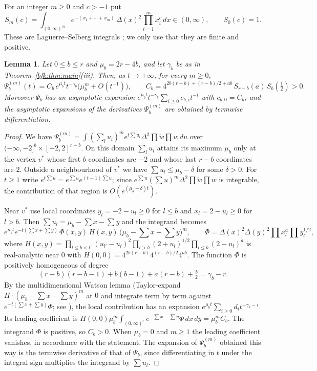 \documentclass[11pt,a4paper]{article}
\newtheorem{lemma}[theorem]{Lemma}
\theoremstyle{definition}
\theoremstyle{remark}
\numberwithin{equation}{section}
\begin{document}
For an integer $m\ge0$ and $c>-1$ put
\[
S_m(c)=\int_{(0,\infty)^m}e^{-(x_1+\cdots+x_m)}\,\Delta(x)^2\prod_{i=1}^mx_i^{c}\,dx\in(0,\infty),\qquad S_0(c)=1 .
\]
These are Laguerre--Selberg integrals \cite{FW08}; we only use that they are finite and positive.

\begin{lemma}\label{bfk:lem:vertex}
Let $0\le b\le r$ and $\mu_b=2r-4b$, and let $\gamma_b$ be as in Theorem~\ref{bfk:thm:main}(iii). Then, as $t\to+\infty$, for every $m\ge0$,
\[
\Psi_b^{(m)}(t)=C_b\,e^{\mu_bt}t^{-\gamma_b}\bigl(\mu_b^m+O(t^{-1})\bigr),\qquad
C_b=4^{2b(r-b)+(r-b)/2+ab}\,S_{r-b}(a)\,S_b(\tfrac12)>0 .
\]
Moreover $\Psi_b$ has an asymptotic expansion $e^{\mu_bt}t^{-\gamma_b}\sum_{i\ge0}c_{b,i}t^{-i}$ with $c_{b,0}=C_b$, and the asymptotic expansions of the derivatives $\Psi_b^{(m)}$ are obtained by termwise differentiation.
\end{lemma}

\begin{proof}
We have $\Psi_b^{(m)}=\int(\textstyle\sum_lu_l)^me^{t\sum u_l}\Delta^2\prod\tilde w\prod w\,du$ over $(-\infty,-2]^b\times[-2,2]^{r-b}$. On this domain $\sum_lu_l$ attains its maximum $\mu_b$ only at the vertex $v^*$ whose first $b$ coordinates are $-2$ and whose last $r-b$ coordinates are $2$. Outside a neighbourhood of $v^*$ we have $\sum u_l\le\mu_b-\delta$ for some $\delta>0$. For $t\ge1$ write $e^{t\sum u}=e^{\sum u}e^{(t-1)\sum u}$; since $e^{\sum u}(\sum u)^m\Delta^2\prod\tilde w\prod w$ is integrable, the contribution of that region is $O(e^{(\mu_b-\delta)t})$.

Near $v^*$ use local coordinates $y_l=-2-u_l\ge0$ for $l\le b$ and $x_l=2-u_l\ge0$ for $l>b$. Then $\sum u_l=\mu_b-\sum x-\sum y$ and the integrand becomes
\[
e^{\mu_bt}e^{-t(\sum x+\sum y)}\,\Phi(x,y)\,H(x,y)\,\bigl(\mu_b-\textstyle\sum x-\sum y\bigr)^m,
\qquad \Phi=\Delta(x)^2\Delta(y)^2\prod x_l^{a}\prod y_l^{1/2},
\]
where $H(x,y)=\prod_{l\le b<l'}(u_{l'}-u_l)^2\prod_{l>b}(2+u_l)^{1/2}\prod_{l\le b}(2-u_l)^{a}$ is real-analytic near $0$ with $H(0,0)=4^{2b(r-b)}4^{(r-b)/2}4^{ab}$. The function $\Phi$ is positively homogeneous of degree
\[
(r-b)(r-b-1)+b(b-1)+a(r-b)+\tfrac b2=\gamma_b-r .
\]
By the multidimensional Watson lemma (Taylor-expand $H\cdot(\mu_b-\sum x-\sum y)^m$ at $0$ and integrate term by term against $e^{-t(\sum x+\sum y)}\Phi$; see \cite{Won89}), the local contribution has an expansion $e^{\mu_bt}\sum_{i\ge0}d_it^{-\gamma_b-i}$. Its leading coefficient is $H(0,0)\mu_b^m\int_{(0,\infty)^r}e^{-\sum x-\sum y}\Phi\,dx\,dy=\mu_b^mC_b$. The integrand $\Phi$ is positive, so $C_b>0$. When $\mu_b=0$ and $m\ge1$ the leading coefficient vanishes, in accordance with the statement. The expansion of $\Psi_b^{(m)}$ obtained this way is the termwise derivative of that of $\Psi_b$, since differentiating in $t$ under the integral sign multiplies the integrand by $\sum u_l$.
\end{proof}
\end{document}
